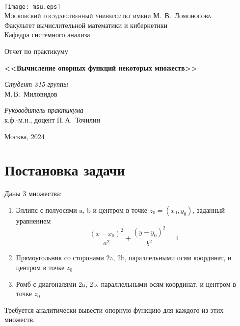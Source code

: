 \documentclass[11pt]{article}
\begin{document}
\thispagestyle{empty}

\begin{center}
\ \vspace{-3cm}

\texttt{[image: msu.eps]}\\
{\scshape Московский государственный университет имени М.~В.~Ломоносова}\\
Факультет вычислительной математики и кибернетики\\
Кафедра системного анализа

\vfill

{\LARGE Отчет по практикуму}

\vspace{1cm}

{\Huge\bfseries <<Вычисление опорных функций некоторых множеств>>}
\end{center}

\vspace{1cm}

\begin{flushright}
  \large
  \textit{Студент 315 группы}\\
  М.\,В.~Миловидов

  \vspace{5mm}

  \textit{Руководитель практикума}\\
  к.ф.-м.н., доцент П.\,А.~Точилин
\end{flushright}

\vfill

\begin{center}
Москва, 2024
\end{center}

\newpage
\section{Постановка задачи}

Даны 3 множества:
\begin{enumerate}
\item Эллипс с полуосями a, b и центром в точке $z_0 = (x_0, y_0)$, заданный уравнением
\[
\frac{(x - x_0)^2}{a^2} + \frac{(y - y_0)^2}{b^2} = 1
\]
\item Прямоугольник со сторонами 2a, 2b, параллельными осям координат, и центром в точке $z_0$
\item Ромб с диагоналями 2a, 2b, параллельными осям координат, и центром в точке $z_0$
\end{enumerate}
Требуется аналитически вывести опорную функцию для каждого из этих множеств.
\end{document}
